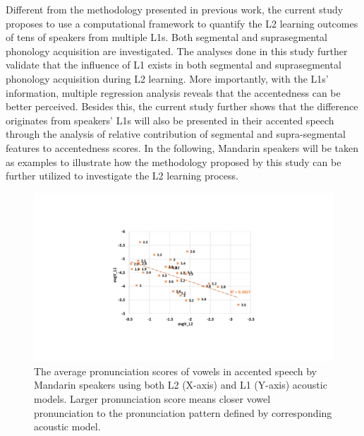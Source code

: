 Different from the methodology presented in previous work, the current study proposes to use a computational framework to quantify the L2 learning outcomes of tens of speakers from multiple L1s. Both segmental and suprasegmental phonology acquisition are investigated. The analyses done in this study further validate that the influence of L1 exists in both segmental and suprasegmental phonology acquisition during L2 learning. More importantly, with the L1s' information, multiple regression analysis reveals that the accentedness can be better perceived. Besides this, the current study further shows that the difference originates from speakers' L1s will also be presented in their accented speech through the analysis of relative contribution of segmental and supra-segmental features to accentedness scores. In the following, Mandarin speakers will be taken as examples to illustrate how the methodology proposed by this study can be further utilized to investigate the L2 learning process.

\begin{figure}[t]
        \begin{minipage}[t]{1.0\linewidth}
        \centering
            \includegraphics[width=5.0in]{figures/ch7_seg.pdf}
        \end{minipage}%
        \caption{The average pronunciation scores of vowels in accented speech by Mandarin speakers using both L2 (X-axis) and L1 (Y-axis) acoustic models. Larger pronunciation score means closer vowel pronunciation to the pronunciation pattern defined by corresponding acoustic model.}
        \centering
        \label{fig:ch7_seg}
     \end{figure}

